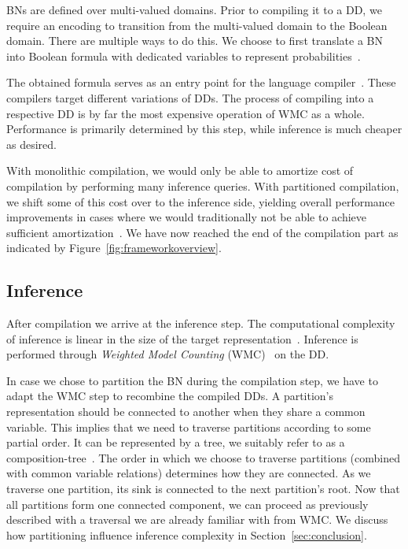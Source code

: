 BNs are defined over multi-valued domains. Prior to compiling it to a DD, we require an encoding to transition from the multi-valued domain to the Boolean domain. There are multiple ways to do this. We choose to first translate a BN into Boolean formula with dedicated variables to represent probabilities~\cite{chavira2008probabilistic,dal2017wpbdd}.

The obtained formula serves as an entry point for the language compiler~\cite{dudek2020addmc}. These compilers target different variations of DDs. The process of compiling into a respective DD is by far the most expensive operation of WMC as a whole. Performance is primarily determined by this step, while inference is much cheaper as desired.

With monolithic compilation, we would only be able to amortize cost of compilation by performing many inference queries. With partitioned compilation, we shift some of this cost over to the inference side, yielding overall performance improvements in cases where we would traditionally not be able to achieve sufficient amortization~\cite{dal2017reducing}. We have now reached the end of the compilation part as indicated by Figure~\ref{fig:frameworkoverview}.

\subsection{Inference}\label{subsec:inference}

After compilation we arrive at the inference step. The computational complexity of inference is linear in the size of the target representation~\cite{darwiche2002knowledge}. Inference is performed through \emph{Weighted Model Counting} (WMC)~\cite{chavira2008probabilistic} on the DD.

In case we chose to partition the BN during the compilation step, we have to adapt the WMC step to recombine the compiled DDs. A partition's representation should be connected to another when they share a common variable. This implies that we need to traverse partitions according to some partial order. It can be represented by a tree, we suitably refer to as a composition-tree~\cite{dal2021compositional}. The order in which we choose to traverse partitions  (combined with common variable relations) determines how they are connected. As we traverse one partition, its sink is connected to the next partition's root. Now that all partitions form one connected component, we can proceed as previously described with a traversal we are already familiar with from WMC. We discuss how partitioning influence inference complexity in Section~\ref{sec:conclusion}.

